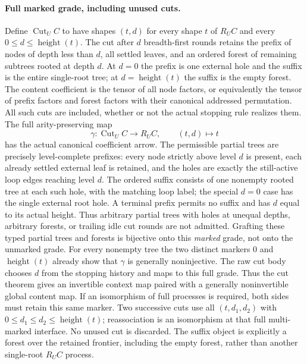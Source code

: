 \documentclass[11pt]{article}
\begin{document}
\paragraph{Full marked grade, including unused cuts.}
Define $\operatorname{Cut}_U C$ to have shapes $(t,d)$ for every shape $t$ of $R_U C$ and every $0\leq d\leq\operatorname{height}(t)$. The cut after $d$ breadth-first rounds retains the prefix of nodes of depth less than $d$, all settled leaves, and an ordered forest of remaining subtrees rooted at depth $d$. At $d=0$ the prefix is one external hole and the suffix is the entire single-root tree; at $d=\operatorname{height}(t)$ the suffix is the empty forest. The content coefficient is the tensor of all node factors, or equivalently the tensor of prefix factors and forest factors with their canonical addressed permutation. All such cuts are included, whether or not the actual stopping rule realizes them. The full arity-preserving map
\[
 \gamma:\operatorname{Cut}_U C\longrightarrow R_U C,
 \qquad(t,d)\longmapsto t
\]
has the actual canonical coefficient arrow. The permissible partial trees are precisely level-complete prefixes: every node strictly above level $d$ is present, each already settled external leaf is retained, and the holes are exactly the still-active loop edges reaching level $d$. The ordered suffix consists of one nonempty rooted tree at each such hole, with the matching loop label; the special $d=0$ case has the single external root hole. A terminal prefix permits no suffix and has $d$ equal to its actual height. Thus arbitrary partial trees with holes at unequal depths, arbitrary forests, or trailing idle cut rounds are not admitted. Grafting these typed partial trees and forests is bijective onto this \emph{marked} grade, not onto the unmarked grade. For every nonempty tree the two distinct markers $0$ and $\operatorname{height}(t)$ already show that $\gamma$ is generally noninjective. The raw cut body chooses $d$ from the stopping history and maps to this full grade. Thus the cut theorem gives an invertible context map paired with a generally noninvertible global content map. If an isomorphism of full processes is required, both sides must retain this same marker. Two successive cuts use all $(t,d_1,d_2)$ with $0\leq d_1\leq d_2\leq\operatorname{height}(t)$; reassociation is an isomorphism at that full multi-marked interface. No unused cut is discarded. The suffix object is explicitly a forest over the retained frontier, including the empty forest, rather than another single-root $R_U C$ process.
\end{document}
